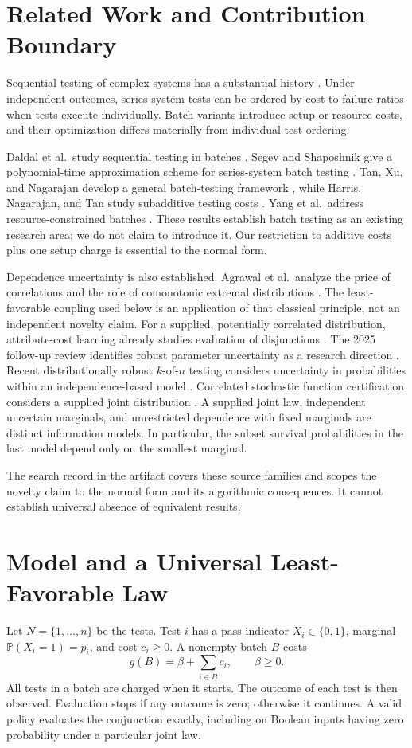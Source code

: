 \documentclass[runningheads]{llncs}
\newcommand{\Prb}{\mathbb{P}}
\begin{document}
\section{Related Work and Contribution Boundary}
Sequential testing of complex systems has a substantial history
\cite{unluyurt2004,unluyurt2025}. Under independent outcomes, series-system tests can be
ordered by cost-to-failure ratios when tests execute individually. Batch
variants introduce setup or resource costs, and their optimization differs
materially from individual-test ordering.

Daldal et al.\ study sequential testing in batches \cite{daldal2017}.
Segev and Shaposhnik give a polynomial-time approximation scheme for
series-system batch testing \cite{segev2022}. Tan, Xu, and Nagarajan develop
a general batch-testing framework \cite{tan2025}, while Harris, Nagarajan,
and Tan study subadditive testing costs \cite{harris2025}. Yang et al.\
address resource-constrained batches \cite{yang2024}. These results establish
batch testing as an existing research area; we do not claim to introduce it.
Our restriction to additive costs plus one setup charge is essential to the
normal form.

Dependence uncertainty is also established. Agrawal et al.\ analyze the price
of correlations and the role of comonotonic extremal distributions
\cite{agrawal2012}. The least-favorable coupling used below is an application
of that classical principle, not an independent novelty claim.
For a supplied, potentially correlated distribution, attribute-cost learning
already studies evaluation of disjunctions \cite{kaplan2005}. The 2025 follow-up
review identifies robust parameter uncertainty as a research direction
\cite{unluyurt2025}. Recent distributionally robust $k$-of-$n$ testing considers uncertainty in
probabilities within an independence-based model \cite{tan2026}.
Correlated stochastic function certification considers a supplied joint
distribution \cite{ghuge2026}. A supplied joint law, independent uncertain
marginals, and unrestricted dependence with fixed marginals are distinct
information models. In particular, the subset survival probabilities in the
last model depend only on the smallest marginal.

The search record in the artifact covers these source families and scopes
the novelty claim to the normal form and its algorithmic consequences.
It cannot establish universal absence of equivalent results.

\section{Model and a Universal Least-Favorable Law}
Let $N=\{1,\ldots,n\}$ be the tests. Test $i$ has a pass indicator
$X_i\in\{0,1\}$, marginal $\Prb(X_i=1)=p_i$, and cost $c_i\geq0$.
A nonempty batch $B$ costs
\[
g(B)=\beta+\sum_{i\in B}c_i,\qquad \beta\geq0.
\]
All tests in a batch are charged when it starts. The outcome of each test
is then observed. Evaluation stops if any outcome is zero; otherwise it
continues. A valid policy evaluates the conjunction exactly, including on
Boolean inputs having zero probability under a particular joint law.
\end{document}
